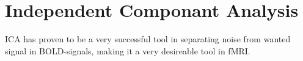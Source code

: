 
\section{Independent Componant Analysis}
ICA has proven to be a very successful tool in separating noise from wanted signal in BOLD-signals, making it a very desireable tool in fMRI.\cite{Salimi-Khorshidi2014} 